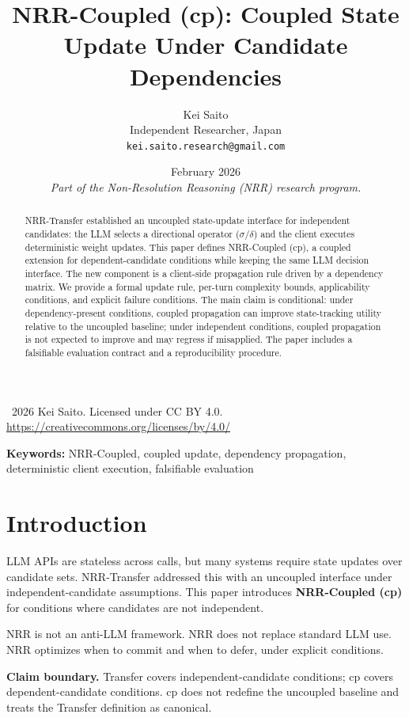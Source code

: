 \documentclass[11pt,a4paper]{article}
\title{\textbf{NRR-Coupled (cp): Coupled State Update Under Candidate Dependencies}}
\author{Kei Saito\\Independent Researcher, Japan\\\texttt{kei.saito.research@gmail.com}}
\date{February 2026\\[0.5em]\textit{Part of the Non-Resolution Reasoning (NRR) research program.}}
\begin{document}
\maketitle

\begin{center}
\textcopyright\ 2026 Kei Saito. Licensed under CC BY 4.0.\\
\url{https://creativecommons.org/licenses/by/4.0/}
\end{center}

\begin{abstract}
NRR-Transfer established an uncoupled state-update interface for independent candidates: the LLM selects a directional operator (\(\sigma\)/\(\delta\)) and the client executes deterministic weight updates. This paper defines NRR-Coupled (cp), a coupled extension for dependent-candidate conditions while keeping the same LLM decision interface. The new component is a client-side propagation rule driven by a dependency matrix. We provide a formal update rule, per-turn complexity bounds, applicability conditions, and explicit failure conditions. The main claim is conditional: under dependency-present conditions, coupled propagation can improve state-tracking utility relative to the uncoupled baseline; under independent conditions, coupled propagation is not expected to improve and may regress if misapplied. The paper includes a falsifiable evaluation contract and a reproducibility procedure.
\end{abstract}

\noindent\textbf{Keywords:} NRR-Coupled, coupled update, dependency propagation, deterministic client execution, falsifiable evaluation

\section{Introduction}
LLM APIs are stateless across calls, but many systems require state updates over candidate sets. NRR-Transfer addressed this with an uncoupled interface under independent-candidate assumptions. This paper introduces \textbf{NRR-Coupled (cp)} for conditions where candidates are not independent.

NRR is not an anti-LLM framework.
NRR does not replace standard LLM use.
NRR optimizes when to commit and when to defer, under explicit conditions.

\textbf{Claim boundary.}
Transfer covers independent-candidate conditions; cp covers dependent-candidate conditions. cp does not redefine the uncoupled baseline and treats the Transfer definition as canonical.
\end{document}
